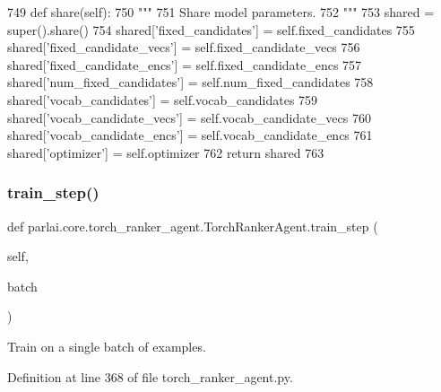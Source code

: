 \begin{DoxyCode}
749     \textcolor{keyword}{def }share(self):
750         \textcolor{stringliteral}{"""}
751 \textcolor{stringliteral}{        Share model parameters.}
752 \textcolor{stringliteral}{        """}
753         shared = super().share()
754         shared[\textcolor{stringliteral}{'fixed\_candidates'}] = self.fixed\_candidates
755         shared[\textcolor{stringliteral}{'fixed\_candidate\_vecs'}] = self.fixed\_candidate\_vecs
756         shared[\textcolor{stringliteral}{'fixed\_candidate\_encs'}] = self.fixed\_candidate\_encs
757         shared[\textcolor{stringliteral}{'num\_fixed\_candidates'}] = self.num\_fixed\_candidates
758         shared[\textcolor{stringliteral}{'vocab\_candidates'}] = self.vocab\_candidates
759         shared[\textcolor{stringliteral}{'vocab\_candidate\_vecs'}] = self.vocab\_candidate\_vecs
760         shared[\textcolor{stringliteral}{'vocab\_candidate\_encs'}] = self.vocab\_candidate\_encs
761         shared[\textcolor{stringliteral}{'optimizer'}] = self.optimizer
762         \textcolor{keywordflow}{return} shared
763 
\end{DoxyCode}
\mbox{\label{classparlai_1_1core_1_1torch__ranker__agent_1_1TorchRankerAgent_a05ddf921f386f21116ec0ef50796987a}} 
\subsubsection{\texorpdfstring{train\+\_\+step()}{train\_step()}}
{\footnotesize\ttfamily def parlai.\+core.\+torch\+\_\+ranker\+\_\+agent.\+Torch\+Ranker\+Agent.\+train\+\_\+step (\begin{DoxyParamCaption}\item[{}]{self,  }\item[{}]{batch }\end{DoxyParamCaption})}

\begin{DoxyVerb}Train on a single batch of examples.
\end{DoxyVerb}
 

Definition at line 368 of file torch\+\_\+ranker\+\_\+agent.\+py.


